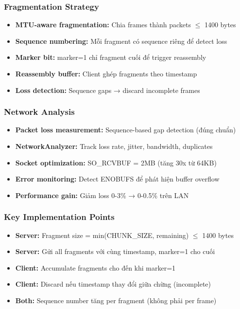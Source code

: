 \subsubsection{Fragmentation Strategy}
\begin{itemize}
    \item \textbf{MTU-aware fragmentation:} Chia frames thành packets $\leq$ 1400 bytes
    \item \textbf{Sequence numbering:} Mỗi fragment có sequence riêng để detect loss
    \item \textbf{Marker bit:} marker=1 chỉ fragment cuối để trigger reassembly
    \item \textbf{Reassembly buffer:} Client ghép fragments theo timestamp
    \item \textbf{Loss detection:} Sequence gaps → discard incomplete frames
\end{itemize}

\subsubsection{Network Analysis}
\begin{itemize}
    \item \textbf{Packet loss measurement:} Sequence-based gap detection (đúng chuẩn)
    \item \textbf{NetworkAnalyzer:} Track loss rate, jitter, bandwidth, duplicates
    \item \textbf{Socket optimization:} SO\_RCVBUF = 2MB (tăng 30x từ 64KB)
    \item \textbf{Error monitoring:} Detect ENOBUFS để phát hiện buffer overflow
    \item \textbf{Performance gain:} Giảm loss 0-3\% → 0-0.5\% trên LAN
\end{itemize}

\subsubsection{Key Implementation Points}
\begin{itemize}
    \item \textbf{Server:} Fragment size = min(CHUNK\_SIZE, remaining) $\leq$ 1400 bytes
    \item \textbf{Server:} Gửi all fragments với cùng timestamp, marker=1 cho cuối
    \item \textbf{Client:} Accumulate fragments cho đến khi marker=1
    \item \textbf{Client:} Discard nếu timestamp thay đổi giữa chừng (incomplete)
    \item \textbf{Both:} Sequence number tăng per fragment (không phải per frame)
\end{itemize}

